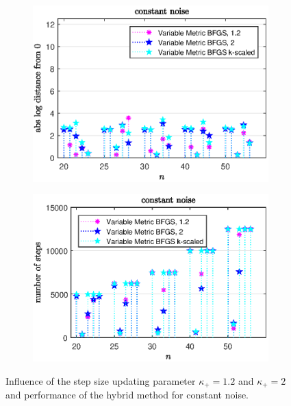 \vspace{-1.5em}

\begin{figure}[H]
	\begin{subfigure}{0.49\textwidth}
		\includegraphics[width=\textwidth]{Pictures/Plots/constant_noise_compb.eps}%
	\end{subfigure}
	\begin{subfigure}{0.49\textwidth}
		\includegraphics[width=\textwidth]{Pictures/Plots/steps_constant_noise_compb.eps}%
	\end{subfigure}
	\caption{Influence of the step size updating parameter \(\kappa_+ = 1.2\) and \(\kappa_+ =2 \) and performance of the hybrid method for constant noise.}%
	\label{fig_const_noise_comp_large}%
\end{figure}

